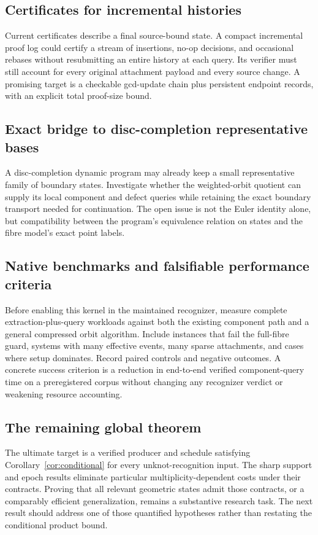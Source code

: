 \documentclass[11pt]{article}
\theoremstyle{definition}
\begin{document}
\subsection{Certificates for incremental histories}
Current certificates describe a final source-bound state. A compact incremental proof log could certify a stream of insertions, no-op decisions, and occasional rebases without resubmitting an entire history at each query. Its verifier must still account for every original attachment payload and every source change. A promising target is a checkable gcd-update chain plus persistent endpoint records, with an explicit total proof-size bound.

\subsection{Exact bridge to disc-completion representative bases}
A disc-completion dynamic program may already keep a small representative family of boundary states. Investigate whether the weighted-orbit quotient can supply its local component and defect queries while retaining the exact boundary transport needed for continuation. The open issue is not the Euler identity alone, but compatibility between the program's equivalence relation on states and the fibre model's exact point labels.

\subsection{Native benchmarks and falsifiable performance criteria}
Before enabling this kernel in the maintained recognizer, measure complete extraction-plus-query workloads against both the existing component path and a general compressed orbit algorithm. Include instances that fail the full-fibre guard, systems with many effective events, many sparse attachments, and cases where setup dominates. Record paired controls and negative outcomes. A concrete success criterion is a reduction in end-to-end verified component-query time on a preregistered corpus without changing any recognizer verdict or weakening resource accounting.

\subsection{The remaining global theorem}
The ultimate target is a verified producer and schedule satisfying Corollary~\ref{cor:conditional} for every unknot-recognition input. The sharp support and epoch results eliminate particular multiplicity-dependent costs under their contracts. Proving that all relevant geometric states admit those contracts, or a comparably efficient generalization, remains a substantive research task. The next result should address one of those quantified hypotheses rather than restating the conditional product bound.
\end{document}
